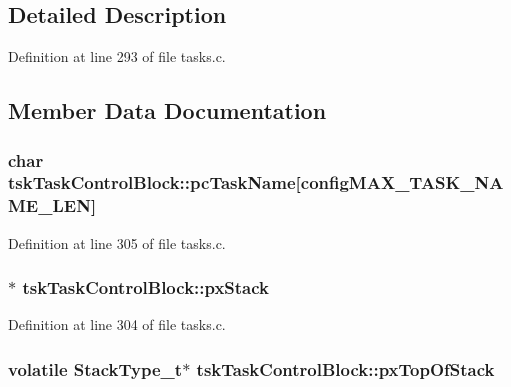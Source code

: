 \subsection{Detailed Description}


Definition at line 293 of file tasks.\+c.



\subsection{Member Data Documentation}
\subsubsection[{\texorpdfstring{pc\+Task\+Name}{pcTaskName}}]{\setlength{\rightskip}{0pt plus 5cm}char tsk\+Task\+Control\+Block\+::pc\+Task\+Name\mbox{[}{\bf config\+M\+A\+X\+\_\+\+T\+A\+S\+K\+\_\+\+N\+A\+M\+E\+\_\+\+L\+EN}\mbox{]}}\hypertarget{structtsk_task_control_block_a67d61291794f38afb5be5132078bc24f}{}\label{structtsk_task_control_block_a67d61291794f38afb5be5132078bc24f}


Definition at line 305 of file tasks.\+c.

\subsubsection[{\texorpdfstring{px\+Stack}{pxStack}}]{$\ast$ tsk\+Task\+Control\+Block\+::px\+Stack}\hypertarget{structtsk_task_control_block_a9a0d71a9f95dd0609f9911d9efd79134}{}\label{structtsk_task_control_block_a9a0d71a9f95dd0609f9911d9efd79134}


Definition at line 304 of file tasks.\+c.

\subsubsection[{\texorpdfstring{px\+Top\+Of\+Stack}{pxTopOfStack}}]{\setlength{\rightskip}{0pt plus 5cm}volatile {\bf Stack\+Type\+\_\+t}$\ast$ tsk\+Task\+Control\+Block\+::px\+Top\+Of\+Stack}\hypertarget{structtsk_task_control_block_a429a186c7f8e34aba1eef5e12d215b90}{}\label{structtsk_task_control_block_a429a186c7f8e34aba1eef5e12d215b90}


